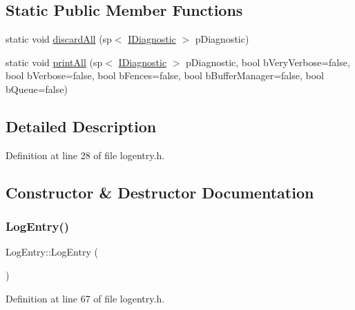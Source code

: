 \subsection*{Static Public Member Functions}
\begin{DoxyCompactItemize}
\item 
static void \mbox{\hyperlink{classLogEntry_ab914112fadd8cd8cf47a4e1e9e09fa72}{discard\+All}} (sp$<$ \mbox{\hyperlink{classhwcomposer_1_1IDiagnostic}{I\+Diagnostic}} $>$ p\+Diagnostic)
\item 
static void \mbox{\hyperlink{classLogEntry_ac8cfea6c35e82f5cae1f37059791738b}{print\+All}} (sp$<$ \mbox{\hyperlink{classhwcomposer_1_1IDiagnostic}{I\+Diagnostic}} $>$ p\+Diagnostic, bool b\+Very\+Verbose=false, bool b\+Verbose=false, bool b\+Fences=false, bool b\+Buffer\+Manager=false, bool b\+Queue=false)
\end{DoxyCompactItemize}


\subsection{Detailed Description}


Definition at line 28 of file logentry.\+h.



\subsection{Constructor \& Destructor Documentation}
\mbox{\label{classLogEntry_a78c2786c30d8d6ba4b2aa8b372f58305}} 
\subsubsection{\texorpdfstring{Log\+Entry()}{LogEntry()}\hspace{0.1cm}{\footnotesize\ttfamily [1/2]}}
{\footnotesize\ttfamily Log\+Entry\+::\+Log\+Entry (\begin{DoxyParamCaption}{ }\end{DoxyParamCaption})}



Definition at line 67 of file logentry.\+h.


\begin{DoxyCode}{0}
\end{DoxyCode}
\mbox{\label{classLogEntry_a484dd0b15f1339e654b526a8a9a431a3}} 
